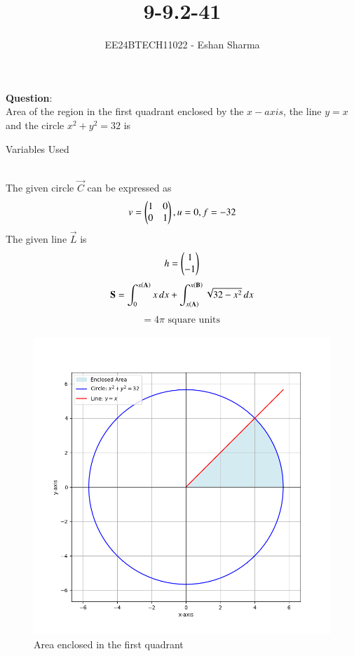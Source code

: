 \documentclass[journal]{IEEEtran}
\begin{document}

\vspace{3cm}

\title{9-9.2-41}
\author{EE24BTECH11022 - Eshan Sharma}
{\let\newpage\relax\maketitle}

\renewcommand{\thefigure}{\theenumi}
\renewcommand{\thetable}{\theenumi}
\setlength{\intextsep}{10pt} %


\renewcommand{\thetable}{\theenumi}

\textbf{Question}:\\
Area of the region in the first quadrant enclosed by the $x-axis$, the line $y = x$ and the circle $x^{2} + y^{2} = 32$ is
\\
\begin{table}[h!]    
  \centering
  
  \caption{Variables Used}
  \label{tab0}
\end{table}
\solution\\
The given circle $\vec{C}$ can be expressed as
\begin{align}
	v = \begin{pmatrix}1&0\\0&1\end{pmatrix}, u = 0, f = -32
\end{align}
The given line $\vec{L}$ is
\begin{align}
	h = \begin{pmatrix}1\\-1\end{pmatrix}
\end{align}
\begin{align}
	\mathbf{S} = \int_{0}^{x\left(\mathbf{A}\right)} x \, dx + \int_{x\left(\mathbf{A}\right)}^{x\left(\mathbf{B}\right)} \sqrt{32-x^{2}} \, dx 
\end{align}
\begin{align}
	= 4\pi \text{ square units }
\end{align}

\begin{figure}[ht]
    \centering
    \includegraphics[width=\linewidth]{figs/9-9.2-41.png}
    \caption{Area enclosed in the first quadrant}
\end{figure}
  
\end{document}
